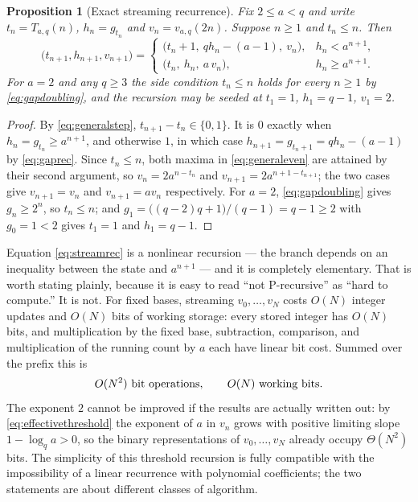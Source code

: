 \documentclass[11pt,letterpaper]{article}
\numberwithin{equation}{section}
\newtheorem{proposition}[theorem]{Proposition}
\theoremstyle{definition}
\theoremstyle{remark}
\begin{document}
\begin{proposition}[Exact streaming recurrence]\label{prop:stream}
Fix $2\le a<q$ and write $t_n=T_{a,q}(n)$, $h_n=g_{t_n}$ and
$v_n=v_{a,q}(2n)$. Suppose $n\ge1$ and $t_n\le n$. Then
\begin{equation}\label{eq:streamrec}
 \bigl(t_{n+1},h_{n+1},v_{n+1}\bigr)=
 \begin{cases}
  \bigl(t_n+1,\ qh_n-(a-1),\ v_n\bigr), & h_n<a^{n+1},\\[0.3em]
  \bigl(t_n,\ h_n,\ a\,v_n\bigr), & h_n\ge a^{n+1}.
 \end{cases}
\end{equation}
For $a=2$ and any $q\ge3$ the side condition $t_n\le n$ holds for every
$n\ge1$ by \eqref{eq:gapdoubling}, and the recursion may be seeded at
$t_1=1$, $h_1=q-1$, $v_1=2$.
\end{proposition}
\begin{proof}
By \eqref{eq:generalstep}, $t_{n+1}-t_n\in\{0,1\}$. It is $0$ exactly when
$h_n=g_{t_n}\ge a^{n+1}$, and otherwise $1$, in which case
$h_{n+1}=g_{t_n+1}=qh_n-(a-1)$ by \eqref{eq:gaprec}. Since $t_n\le n$, both
maxima in \eqref{eq:generaleven} are attained by their second argument, so
$v_n=2a^{n-t_n}$ and $v_{n+1}=2a^{n+1-t_{n+1}}$; the two cases give
$v_{n+1}=v_n$ and $v_{n+1}=av_n$ respectively. For $a=2$,
\eqref{eq:gapdoubling} gives $g_n\ge2^n$, so $t_n\le n$; and
$g_1=\bigl((q-2)q+1\bigr)/(q-1)=q-1\ge2$ with $g_0=1<2$ gives $t_1=1$ and
$h_1=q-1$.
\end{proof}

Equation \eqref{eq:streamrec} is a nonlinear recursion --- the branch
depends on an inequality between the state and $a^{n+1}$ --- and it is
completely elementary. That is worth stating plainly, because it is easy to
read ``not P-recursive'' as ``hard to compute.'' It is not. For fixed
bases, streaming $v_0,\ldots,v_N$ costs $O(N)$ integer updates and $O(N)$
bits of working storage: every stored integer has $O(N)$ bits, and
multiplication by the fixed base, subtraction, comparison, and
multiplication of the running count by $a$ each have linear bit cost.
Summed over the prefix this is
\begin{equation}\label{eq:streamcost}
 O(N^2)\ \hbox{bit operations},\qquad O(N)\ \hbox{working bits}.
\end{equation}
The exponent $2$ cannot be improved if the results are actually written
out: by \eqref{eq:effectivethreshold} the exponent of $a$ in $v_n$ grows
with positive limiting slope $1-\log_qa>0$, so the binary representations
of $v_0,\ldots,v_N$ already occupy $\Theta(N^2)$ bits. The simplicity of
this threshold recursion is fully compatible with the impossibility of a
linear recurrence with polynomial coefficients; the two statements are
about different classes of algorithm.
\end{document}
